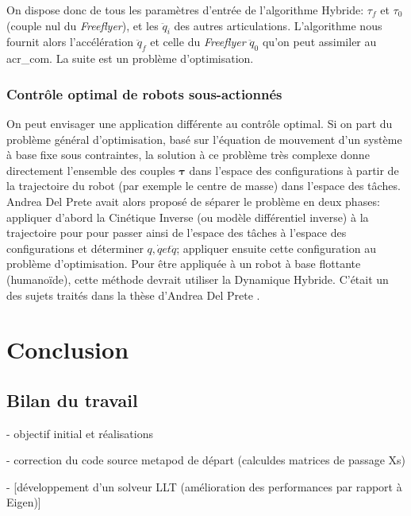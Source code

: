 \documentclass{report}
\begin{document}
On dispose donc de tous les paramètres d'entrée de l'algorithme Hybride: $\tau_f$ et $\tau_0$(couple nul du \emph{Freeflyer}), et les $\ddot{q}_i$ des autres articulations. L'algorithme nous fournit alors l'accélération $\ddot{q}_f$ et celle du \emph{Freeflyer} $\ddot{q}_0$ qu'on peut assimiler au \gls{acr_com}. La suite est un problème d'optimisation.

\subsection{Contrôle optimal de robots sous-actionnés}

On peut envisager une application différente au contrôle optimal. Si on part du problème général d'optimisation, basé sur l'équation de mouvement d'un système à base fixe sous contraintes, la solution à ce problème très complexe donne directement l'ensemble des couples $\mathbf{\tau}$ dans l'espace des configurations à partir de la trajectoire du robot (par exemple le centre de masse) dans l'espace des tâches. Andrea Del Prete avait alors proposé \cite{bib_paper_Andrea} de séparer le problème en deux phases: appliquer d'abord la Cinétique Inverse (ou modèle différentiel inverse) à la trajectoire pour pour passer ainsi de l'espace des tâches à l'espace des configurations et déterminer $q, \dot{q} et \ddot{q}$; appliquer ensuite cette configuration au problème d'optimisation. Pour être appliquée à un robot à base flottante (humanoïde), cette méthode devrait utiliser la Dynamique Hybride. C'était un des sujets traités dans la thèse d'Andrea Del Prete \cite{bib_these_andrea}.



\chapter*{Conclusion}
%

\section*{Bilan du travail}

- objectif initial et réalisations

	- correction du code source metapod de départ (calculdes matrices de passage Xs)
	
	- [développement d'un solveur LLT (amélioration des performances par rapport à Eigen)]
	
\end{document}
